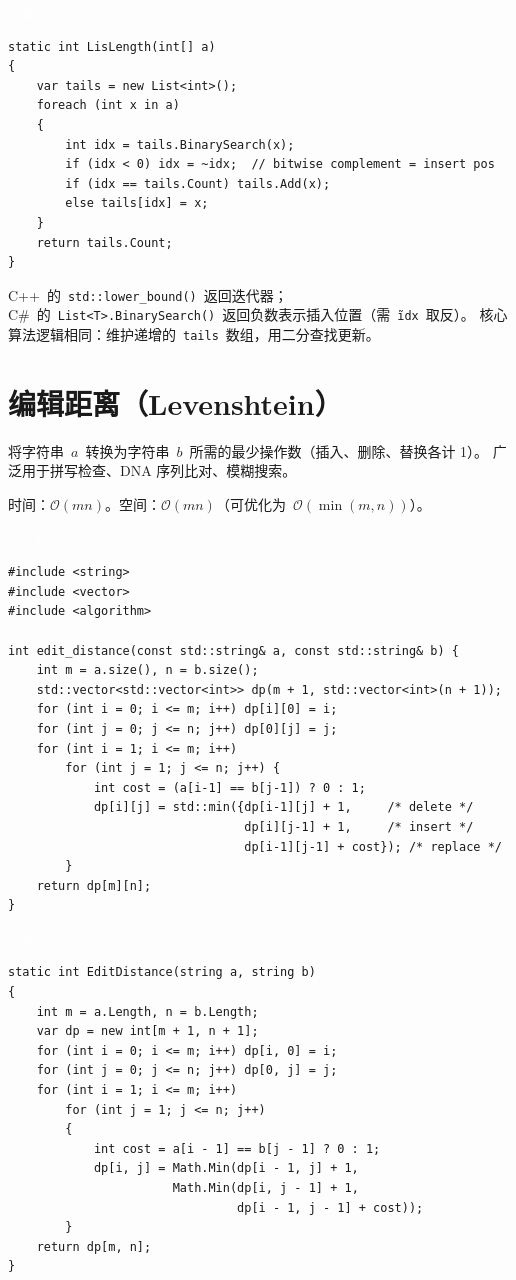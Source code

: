\documentclass[12pt,a4paper,fontset=fandol]{ctexbook}
\newcommand{\cpplabel}{%
  \noindent\begin{tcolorbox}[sharp corners,colback=cppheadbg,colframe=cppheadbg,
    left=6pt,right=6pt,top=2pt,bottom=2pt,boxrule=0pt]
  \textcolor{white}{\small\bfseries\sffamily C++}\end{tcolorbox}%
}
\newcommand{\csharplabel}{%
  \noindent\begin{tcolorbox}[sharp corners,colback=csharpheadbg,colframe=csharpheadbg,
    left=6pt,right=6pt,top=2pt,bottom=2pt,boxrule=0pt]
  \textcolor{white}{\small\bfseries\sffamily C\#}\end{tcolorbox}%
}
\newcommand{\bigO}[1]{\mathcal{O}(#1)}
\newcommand{\Fn}[1]{\texttt{#1()}}
\begin{document}
\csharplabel
\begin{lstlisting}[style=csharpstyle]
static int LisLength(int[] a)
{
    var tails = new List<int>();
    foreach (int x in a)
    {
        int idx = tails.BinarySearch(x);
        if (idx < 0) idx = ~idx;  // bitwise complement = insert pos
        if (idx == tails.Count) tails.Add(x);
        else tails[idx] = x;
    }
    return tails.Count;
}
\end{lstlisting}

\begin{compare}
C++~的~\Fn{std::lower\_bound}~返回迭代器；C\#~的~\Fn{List<T>.BinarySearch}~返回负数表示插入位置（需~\texttt{\~idx}~取反）。
核心算法逻辑相同：维护递增的~\texttt{tails}~数组，用二分查找更新。
\end{compare}

\chapter{编辑距离（Levenshtein）}

将字符串~$a$~转换为字符串~$b$~所需的最少操作数（插入、删除、替换各计 1）。
广泛用于拼写检查、DNA 序列比对、模糊搜索。

\begin{complexitybox}
  时间：$\bigO{mn}$。空间：$\bigO{mn}$（可优化为~$\bigO{\min(m,n)}$）。
\end{complexitybox}

\cpplabel
\begin{lstlisting}[style=cppstyle]
#include <string>
#include <vector>
#include <algorithm>

int edit_distance(const std::string& a, const std::string& b) {
    int m = a.size(), n = b.size();
    std::vector<std::vector<int>> dp(m + 1, std::vector<int>(n + 1));
    for (int i = 0; i <= m; i++) dp[i][0] = i;
    for (int j = 0; j <= n; j++) dp[0][j] = j;
    for (int i = 1; i <= m; i++)
        for (int j = 1; j <= n; j++) {
            int cost = (a[i-1] == b[j-1]) ? 0 : 1;
            dp[i][j] = std::min({dp[i-1][j] + 1,     /* delete */
                                 dp[i][j-1] + 1,     /* insert */
                                 dp[i-1][j-1] + cost}); /* replace */
        }
    return dp[m][n];
}
\end{lstlisting}

\csharplabel
\begin{lstlisting}[style=csharpstyle]
static int EditDistance(string a, string b)
{
    int m = a.Length, n = b.Length;
    var dp = new int[m + 1, n + 1];
    for (int i = 0; i <= m; i++) dp[i, 0] = i;
    for (int j = 0; j <= n; j++) dp[0, j] = j;
    for (int i = 1; i <= m; i++)
        for (int j = 1; j <= n; j++)
        {
            int cost = a[i - 1] == b[j - 1] ? 0 : 1;
            dp[i, j] = Math.Min(dp[i - 1, j] + 1,
                       Math.Min(dp[i, j - 1] + 1,
                                dp[i - 1, j - 1] + cost));
        }
    return dp[m, n];
}
\end{lstlisting}
\end{document}

